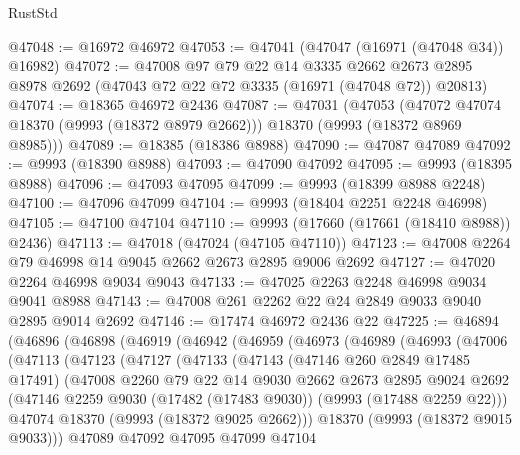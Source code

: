 \begin{lexlean}{RustStd}
\begin{coremodule}
@47048 := @16972 @46972
@47053 := @47041 (@47047 (@16971 (@47048 @34)) @16982)
@47072 := @47008
    @97
    @79
    @22
    @14
    @3335
    @2662
    @2673
    @2895
    @8978
    @2692
    (@47043 @72 @22 @72 @3335 (@16971 (@47048 @72)) @20813)
@47074 := @18365 @46972 @2436
@47087 := @47031
    (@47053 (@47072 @47074 @18370 (@9993 (@18372 @8979 @2662))) @18370 (@9993 (@18372 @8969 @8985)))
@47089 := @18385 (@18386 @8988)
@47090 := @47087 @47089
@47092 := @9993 (@18390 @8988)
@47093 := @47090 @47092
@47095 := @9993 (@18395 @8988)
@47096 := @47093 @47095
@47099 := @9993 (@18399 @8988 @2248)
@47100 := @47096 @47099
@47104 := @9993 (@18404 @2251 @2248 @46998)
@47105 := @47100 @47104
@47110 := @9993 (@17660 (@17661 (@18410 @8988)) @2436)
@47113 := @47018 (@47024 (@47105 @47110))
@47123 := @47008 @2264 @79 @46998 @14 @9045 @2662 @2673 @2895 @9006 @2692
@47127 := @47020 @2264 @46998 @9034 @9043
@47133 := @47025 @2263 @2248 @46998 @9034 @9041 @8988
@47143 := @47008 @261 @2262 @22 @24 @2849 @9033 @9040 @2895 @9014 @2692
@47146 := @17474 @46972 @2436 @22
@47225 := @46894
    (@46896
      (@46898
        (@46919
          (@46942
            (@46959
              (@46973
                (@46989
                  (@46993
                    (@47006
                      (@47113
                        (@47123
                          (@47127
                            (@47133
                              (@47143
                                (@47146 @260 @2849 @17485 @17491)
                                (@47008
                                  @2260
                                  @79
                                  @22
                                  @14
                                  @9030
                                  @2662
                                  @2673
                                  @2895
                                  @9024
                                  @2692
                                  (@47146
                                    @2259
                                    @9030
                                    (@17482 (@17483 @9030))
                                    (@9993 (@17488 @2259 @22)))
                                  @47074
                                  @18370
                                  (@9993 (@18372 @9025 @2662)))
                                @18370
                                (@9993 (@18372 @9015 @9033)))
                              @47089
                              @47092
                              @47095
                              @47099
                              @47104

\end{coremodule}
\end{lexlean}
